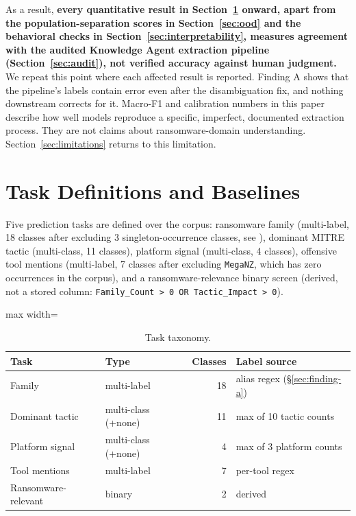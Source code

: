 \documentclass[preprint,12pt]{elsarticle}
\newenvironment{fittable}{\begin{adjustbox}{max width=\textwidth}}{\end{adjustbox}}
\begin{document}
As a result, \textbf{every quantitative result in
Section~\ref{sec:baselines} onward, apart from the population-separation
scores in Section~\ref{sec:ood} and the behavioral checks in
Section~\ref{sec:interpretability}, measures agreement
with the audited Knowledge Agent extraction pipeline (Section~\ref{sec:audit}),
not verified accuracy against human judgment.} We repeat this point where
each affected result is reported. Finding A shows that the pipeline's labels
contain error even after the disambiguation fix, and nothing downstream
corrects for it. Macro-F1 and calibration numbers in this paper describe how
well models reproduce a specific, imperfect, documented extraction process.
They are not claims about ransomware-domain understanding.
Section~\ref{sec:limitations} returns to this limitation.

\section{Task Definitions and Baselines}
\label{sec:baselines}

Five prediction tasks are defined over the corpus: ransomware family
(multi-label, 18 classes after excluding 3 singleton-occurrence classes,
see ), dominant MITRE tactic (multi-class, 11 classes),
platform signal (multi-class, 4 classes), offensive tool mentions
(multi-label, 7 classes after excluding \texttt{MegaNZ}, which has zero
occurrences in the corpus), and a ransomware-relevance binary screen
(derived, not a stored column: \texttt{Family\_Count > 0 OR
  Tactic\_Impact > 0}).

\begin{table}[htbp]
\centering
\caption{Task taxonomy.}
\label{tab:tasks}
\begin{fittable}
\begin{tabular}{llrl}
\toprule
Task & Type & Classes & Label source \\
\midrule
Family              & multi-label            & 18 & alias regex (\S\ref{sec:finding-a}) \\
Dominant tactic      & multi-class (+none)    & 11 & max of 10 tactic counts \\
Platform signal      & multi-class (+none)    &  4 & max of 3 platform counts \\
Tool mentions        & multi-label            &  7 & per-tool regex \\
Ransomware-relevant   & binary                 &  2 & derived \\
\bottomrule
\end{tabular}
\end{fittable}
\end{table}
\end{document}
